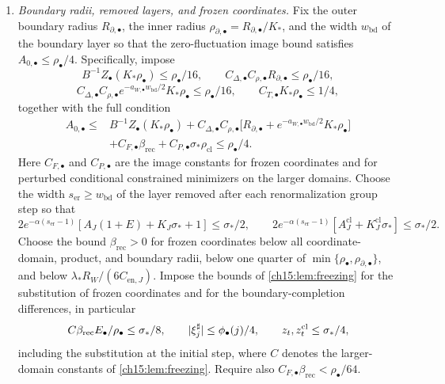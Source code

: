 \begin{theorem}
\begin{enumerate}[label=(\arabic*)]
\item \emph{Boundary radii, removed layers, and frozen coordinates.} Fix the outer boundary radius $R_{\partial,\bullet}$, the inner radius $\rho_{\partial,\bullet}=R_{\partial,\bullet}/K_*$, and the width $w_{\mathrm{bd}}$ of the boundary layer so that the zero-fluctuation image bound satisfies $A_{0,\bullet}\le\rho_\bullet/4$. Specifically, impose
\[
 B^{-1}Z_\bullet(K_*\rho_\bullet)\le\rho_\bullet/16,\qquad
 C_{\Delta,\bullet}C_{\rho,\bullet}R_{\partial,\bullet}\le\rho_\bullet/16,
\]
\[
 C_{\Delta,\bullet}C_{\rho,\bullet}e^{-a_{W,\bullet}w_{\mathrm{bd}}/2}K_*\rho_\bullet\le\rho_\bullet/16,\qquad
 C_{T,\bullet}K_*\rho_\bullet\le1/4,
\]
together with the full condition
\[
\begin{split}
 A_{0,\bullet}\le{}&B^{-1}Z_\bullet(K_*\rho_\bullet)
 +C_{\Delta,\bullet}C_{\rho,\bullet}\bigl[R_{\partial,\bullet}+e^{-a_{W,\bullet}w_{\mathrm{bd}}/2}K_*\rho_\bullet\bigr]\\
 &+C_{F,\bullet}\beta_{\mathrm{rec}}+C_{P,\bullet}\sigma_*\rho_{\mathrm{cl}}
 \le\rho_\bullet/4.
\end{split}
\]
Here $C_{F,\bullet}$ and $C_{P,\bullet}$ are the image constants for frozen coordinates and for perturbed conditional constrained minimizers on the larger domains. Choose the width $s_{\mathrm{er}}\ge w_{\mathrm{bd}}$ of the layer removed after each renormalization group step so that
\[
 2e^{-\alpha(s_{\mathrm{er}}-1)}[A_J(1+E)+K_J\sigma_*+1]\le\sigma_*/2,\qquad
 2e^{-\alpha(s_{\mathrm{er}}-1)}[A_J^{\mathrm{cl}}+K_J^{\mathrm{cl}}\sigma_*]\le\sigma_*/2.
\]
Choose the bound $\beta_{\mathrm{rec}}>0$ for frozen coordinates below all coordinate-domain, product, and boundary radii, below one quarter of $\min\{\rho_\bullet,\rho_{\partial,\bullet}\}$, and below $\lambda_*R_W/(6C_{\mathrm{en},J})$. Impose the bounds of \cref{ch15:lem:freezing} for the substitution of frozen coordinates and for the boundary-completion differences, in particular
\[
 C\beta_{\mathrm{rec}}E_\bullet/\rho_\bullet\le\sigma_*/8,\qquad
 \lvert \xi_j^\sharp\rvert\le\phi_\bullet(j)/4,\qquad
 z_t,z_t^{\mathrm{cl}}\le\sigma_*/4,
\]
including the substitution at the initial step, where $C$ denotes the larger-domain constants of \cref{ch15:lem:freezing}. Require also $C_{F,\bullet}\beta_{\mathrm{rec}}<\rho_\bullet/64$.


\end{enumerate}
\end{theorem}
